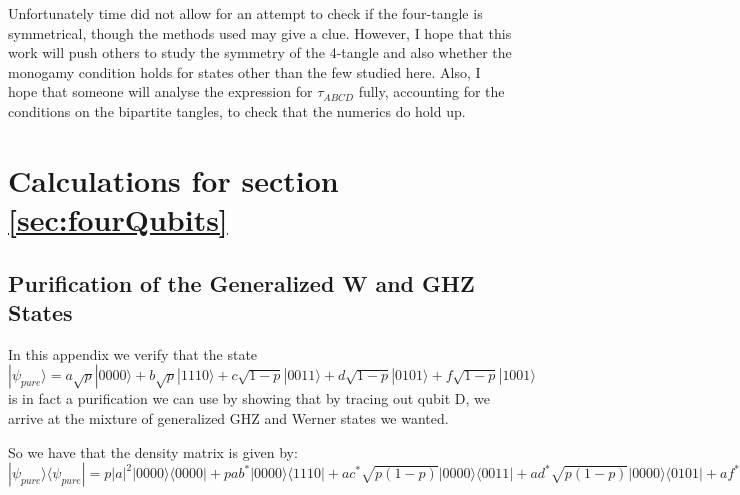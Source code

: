\documentclass[12pt,a4paper]{article}
\numberwithin{equation}{section}
\begin{document}
Unfortunately time did not allow for an attempt to check if the four-tangle is symmetrical, though the methods used may give a clue. However, I hope that this work will push others to study the symmetry of the 4-tangle and also whether the monogamy condition holds for states other than the few studied here. Also, I hope that someone will analyse the expression for $\tau_{ABCD}$ fully, accounting for the conditions on the bipartite tangles, to check that the numerics do hold up.

\newpage

\appendix

\section{Calculations for section \ref{sec:fourQubits}}
\label{app:calculations}

\subsection{Purification of the Generalized W and GHZ States}
\label{app:purification}

In this appendix we verify that the state $|\psi_{pure}\rangle = a\sqrt{p}|0000\rangle + b\sqrt{p}|1110\rangle + c\sqrt{1-p}|0011\rangle + d\sqrt{1-p}|0101\rangle + f\sqrt{1-p}|1001\rangle$ is in fact a purification we can use by showing that by tracing out qubit D, we arrive at the mixture of generalized GHZ and Werner states we wanted.

\vskip 5mm

So we have that the density matrix is given by: $|\psi_{pure}\rangle\langle\psi_{pure}| =
 p|a|^2|0000\rangle\langle0000| + pab^*|0000\rangle\langle1110| + ac^*\sqrt{p(1-p)}|0000\rangle\langle0011| + ad^*\sqrt{p(1-p)}|0000\rangle\langle0101| + af^*\sqrt{p(1-p)}|0000\rangle\langle1001| + pba^*|1110\rangle\langle0000| + p|b|^2|1110\rangle\langle1110| + bc^*\sqrt{p(1-p)}|1110\rangle\langle0011| + bd^*\sqrt{p(1-p)}|1110\rangle\langle0101| + bf^*\sqrt{p(1-p)}|1110\rangle\langle1001| + ca^*\sqrt{p(1-p)}|0011\rangle\langle0000| + cb^*\sqrt{p(1-p)}|0011\rangle\langle1110| + |c|^2(1-p)|0011\rangle\langle0011| + cd^*(1-p)|0011\rangle\langle0101| + cf^*(1-p)|0011\rangle\langle1001| + da^*\sqrt{p(1-p)}|0101\rangle\langle0000| + db^*\sqrt{p(1-p)}|0101\rangle\langle1110| + dc^*(1-p)|0101\rangle\langle0011| + |d|^2(1-p)|0101\rangle\langle0101| + df^*(1-p)|0101\rangle\langle1001| + fa^*\sqrt{p(1-p)}|1001\rangle\langle0000| + fb^*\sqrt{p(1-p)}|1001\rangle\langle1110| + fc^*(1-p)|1001\rangle\langle0011| + fd^*(1-p)|1001\rangle\langle0101| + |f|^2(1-p)|1001\rangle\langle1001|$
\end{document}
